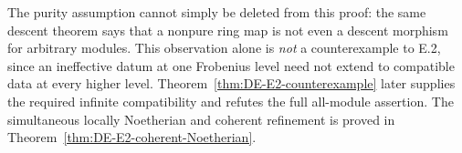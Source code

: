 The purity assumption cannot simply be deleted from this proof: the same descent theorem says that a nonpure ring map is not even a descent morphism for arbitrary modules.  This observation alone is \emph{not} a counterexample to E.2, since an ineffective datum at one Frobenius level need not extend to compatible data at every higher level.  Theorem~\ref{thm:DE-E2-counterexample} later supplies the required infinite compatibility and refutes the full all-module assertion.  The simultaneous locally Noetherian and coherent refinement is proved in Theorem~\ref{thm:DE-E2-coherent-Noetherian}.
